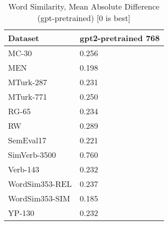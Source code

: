 \begin{table}[]
\centering
\begin{tabular}{l|l}
\hline
Dataset & gpt2-pretrained 768 \\
\hline
MC-30 & 0.256 \\ 
MEN & 0.198 \\ 
MTurk-287 & 0.231 \\ 
MTurk-771 & 0.250 \\ 
RG-65 & 0.234 \\ 
RW & 0.289 \\ 
SemEval17 & 0.221 \\ 
SimVerb-3500 & 0.760 \\ 
Verb-143 & 0.232 \\ 
WordSim353-REL & 0.237 \\ 
WordSim353-SIM & 0.185 \\ 
YP-130 & 0.232
\end{tabular}
\caption{Word Similarity, Mean Absolute Difference (gpt-pretrained) [0 is best]}
\label{tab:similarity-gpt-pretrained}
\end{table}
